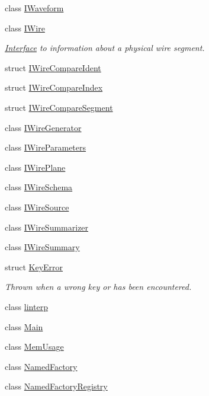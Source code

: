 \begin{DoxyCompactItemize}
\item 
class \hyperlink{class_wire_cell_1_1_i_waveform}{I\+Waveform}
\item 
class \hyperlink{class_wire_cell_1_1_i_wire}{I\+Wire}
\begin{DoxyCompactList}\small\item\em \hyperlink{class_wire_cell_1_1_interface}{Interface} to information about a physical wire segment. \end{DoxyCompactList}\item 
struct \hyperlink{struct_wire_cell_1_1_i_wire_compare_ident}{I\+Wire\+Compare\+Ident}
\item 
struct \hyperlink{struct_wire_cell_1_1_i_wire_compare_index}{I\+Wire\+Compare\+Index}
\item 
struct \hyperlink{struct_wire_cell_1_1_i_wire_compare_segment}{I\+Wire\+Compare\+Segment}
\item 
class \hyperlink{class_wire_cell_1_1_i_wire_generator}{I\+Wire\+Generator}
\item 
class \hyperlink{class_wire_cell_1_1_i_wire_parameters}{I\+Wire\+Parameters}
\item 
class \hyperlink{class_wire_cell_1_1_i_wire_plane}{I\+Wire\+Plane}
\item 
class \hyperlink{class_wire_cell_1_1_i_wire_schema}{I\+Wire\+Schema}
\item 
class \hyperlink{class_wire_cell_1_1_i_wire_source}{I\+Wire\+Source}
\item 
class \hyperlink{class_wire_cell_1_1_i_wire_summarizer}{I\+Wire\+Summarizer}
\item 
class \hyperlink{class_wire_cell_1_1_i_wire_summary}{I\+Wire\+Summary}
\item 
struct \hyperlink{struct_wire_cell_1_1_key_error}{Key\+Error}
\begin{DoxyCompactList}\small\item\em Thrown when a wrong key or has been encountered. \end{DoxyCompactList}\item 
class \hyperlink{class_wire_cell_1_1linterp}{linterp}
\item 
class \hyperlink{class_wire_cell_1_1_main}{Main}
\item 
class \hyperlink{class_wire_cell_1_1_mem_usage}{Mem\+Usage}
\item 
class \hyperlink{class_wire_cell_1_1_named_factory}{Named\+Factory}
\item 
class \hyperlink{class_wire_cell_1_1_named_factory_registry}{Named\+Factory\+Registry}

\end{DoxyCompactItemize}

